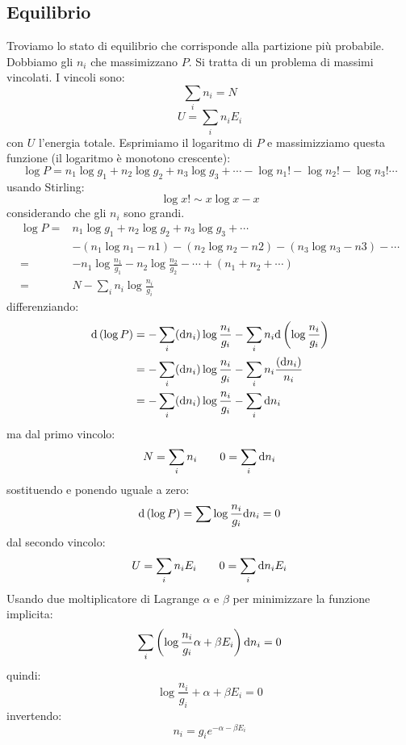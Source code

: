 \subsection{Equilibrio}
Troviamo lo stato di equilibrio che corrisponde alla partizione più probabile. Dobbiamo gli $n_i$ che massimizzano $P$. Si tratta di un problema di massimi vincolati. I vincoli sono:
\begin{equation}
	\sum_{i} n_i=N
\end{equation}
\begin{equation}
	U=\sum_i n_iE_i
\end{equation}
con $U$ l'energia totale. Esprimiamo il logaritmo di $P$ e massimizziamo questa funzione (il logaritmo è monotono crescente):
\begin{equation}
	\log P= n_1\log g_1+n_2\log g_2+n_3\log g_3+\cdots -\log n_1!-\log n_2! -\log n_3!\cdots
\end{equation}
usando Stirling:
\begin{equation}
	\log x!\sim x\log x-x
\end{equation}
considerando che gli $n_i$ sono grandi.
\begin{equation}
	\begin{split}
		\log P=&n_1\log g_1+n_2\log g_2+n_3\log g_3+\cdots\\
		&-(n_1\log n_1-n1)-(n_2\log n_2-n2)-(n_3\log n_3-n3)-\cdots\\
		=&-n_1\log\frac{n_1}{g_1}-n_2\log\frac{n_2}{g_2}-\cdots+(n_1+n_2+\cdots)\\
		=&N-\sum_i n_i\log\frac{n_i}{g_i}
	\end{split}
\end{equation}
differenziando:
\begin{equation}
	\begin{split}
		\mathrm{d}\left(\log P\right)&=-\sum_i(\mathrm{d} n_i)\log\frac{n_i}{g_i}-\sum_i n_i\mathrm{d}\left(\log\frac{n_i}{g_i}\right)\\
		&=-\sum_i(\mathrm{d} n_i)\log\frac{n_i}{g_i}-\sum_i n_i\frac{(\mathrm{d} n_i)}{n_i}\\
		&=-\sum_i(\mathrm{d} n_i)\log\frac{n_i}{g_i}-\sum_i\mathrm{d} n_i
	\end{split}
\end{equation}
ma dal primo vincolo:
\begin{equation}
	N=\sum_i n_i\qquad 0=\sum_i\mathrm{d} n_i
\end{equation}
sostituendo e ponendo uguale a zero:
\begin{equation}
	\mathrm{d}\left(\log P\right)=\sum\log\frac{n_i}{g_i}\mathrm{d} n_i=0
\end{equation}
dal secondo vincolo:
\begin{equation}
	U=\sum_i n_iE_i\qquad 0=\sum_i \mathrm{d} n_iE_i
\end{equation}
Usando due moltiplicatore di Lagrange $\alpha$ e $\beta$ per minimizzare la funzione implicita:
\begin{equation}
	\sum_i\left(\log\frac{n_i}{g_i}\alpha+\beta E_i\right)\mathrm{d} n_i=0
\end{equation}
quindi:
\[
	\log \frac{n_i}{g_i}+\alpha+\beta E_i=0
\]
invertendo:
\begin{equation}
	n_i=g_ie^{-\alpha-\beta E_i}
\end{equation}
